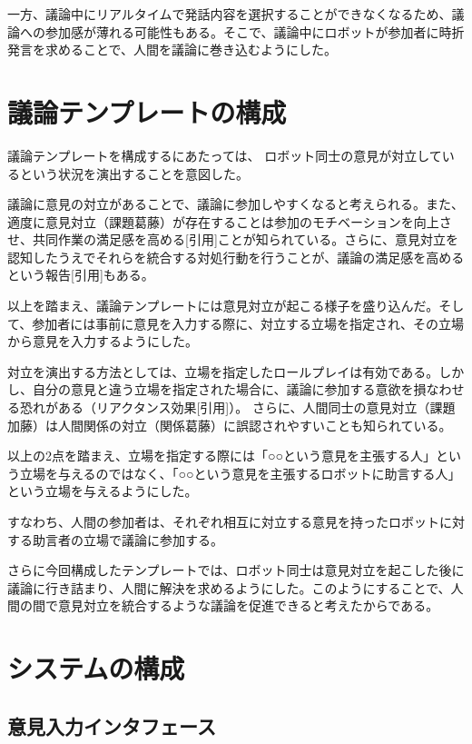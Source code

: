 \documentclass[11pt, a4paper]{jreport} %
\begin{document}
一方、議論中にリアルタイムで発話内容を選択することができなくなるため、議論への参加感が薄れる可能性もある。そこで、議論中にロボットが参加者に時折発言を求めることで、人間を議論に巻き込むようにした。


\section{議論テンプレートの構成}
議論テンプレートを構成するにあたっては、
ロボット同士の意見が対立しているという状況を演出することを意図した。


議論に意見の対立があることで、議論に参加しやすくなると考えられる。また、適度に意見対立（課題葛藤）が存在することは参加のモチベーションを向上させ、共同作業の満足感を高める[引用]ことが知られている。さらに、意見対立を認知したうえでそれらを統合する対処行動を行うことが、議論の満足感を高めるという報告[引用]もある。


以上を踏まえ、議論テンプレートには意見対立が起こる様子を盛り込んだ。そして、参加者には事前に意見を入力する際に、対立する立場を指定され、その立場から意見を入力するようにした。


対立を演出する方法としては、立場を指定したロールプレイは有効である。しかし、自分の意見と違う立場を指定された場合に、議論に参加する意欲を損なわせる恐れがある（リアクタンス効果[引用]）。
さらに、人間同士の意見対立（課題加藤）は人間関係の対立（関係葛藤）に誤認されやすいことも知られている。

以上の2点を踏まえ、立場を指定する際には「○○という意見を主張する人」という立場を与えるのではなく、「○○という意見を主張するロボットに助言する人」という立場を与えるようにした。


すなわち、人間の参加者は、それぞれ相互に対立する意見を持ったロボットに対する助言者の立場で議論に参加する。


さらに今回構成したテンプレートでは、ロボット同士は意見対立を起こした後に議論に行き詰まり、人間に解決を求めるようにした。このようにすることで、人間の間で意見対立を統合するような議論を促進できると考えたからである。




\section{システムの構成}
\label{sec:システム3}

\subsection{意見入力インタフェース}
\end{document}
